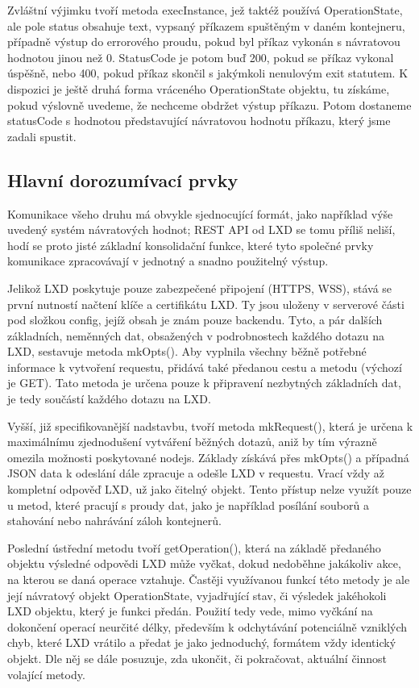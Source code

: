 \documentclass[a4paper,oneside,12pt]{report}
\begin{document}
Zvláštní výjimku tvoří metoda execInstance, jež taktéž používá OperationState, ale pole status obsahuje text, vypsaný příkazem spuštěným v daném kontejneru, případně výstup do errorového proudu, pokud byl příkaz vykonán s návratovou hodnotou jinou než 0. StatusCode je potom buď 200, pokud se příkaz vykonal úspěšně, nebo 400, pokud příkaz skončil s jakýmkoli nenulovým exit statutem. K dispozici je ještě druhá forma vráceného OperationState objektu, tu získáme, pokud výslovně uvedeme, že nechceme obdržet výstup příkazu. Potom dostaneme statusCode s hodnotou představující návratovou hodnotu příkazu, který jsme zadali spustit.

\subsection{Hlavní dorozumívací prvky}
Komunikace všeho druhu má obvykle sjednocující formát, jako například výše uvedený systém návratových hodnot; REST API od LXD se tomu příliš neliší, hodí se proto jisté základní konsolidační funkce, které tyto společné prvky komunikace zpracovávají v jednotný a snadno použitelný výstup.

Jelikož LXD poskytuje pouze zabezpečené připojení (HTTPS, WSS), stává se první nutností načtení klíče a certifikátu LXD. Ty jsou uloženy v serverové části pod složkou config, jejíž obsah je znám pouze backendu. Tyto, a pár dalších základních, neměnných dat, obsažených v podrobnostech každého dotazu na LXD, sestavuje metoda mkOpts(). Aby vyplnila všechny běžně potřebné informace k vytvoření requestu, přidává také předanou cestu a metodu (výchozí je GET). Tato metoda je určena pouze k připravení nezbytných základních dat, je tedy součástí každého dotazu na LXD.

Vyšší, již specifikovanější nadstavbu, tvoří metoda mkRequest(), která je určena k maximálnímu zjednodušení vytváření běžných dotazů, aniž by tím výrazně omezila možnosti poskytované nodejs. Základy získává přes mkOpts() a případná JSON data k odeslání dále zpracuje a odešle LXD v requestu. Vrací vždy až kompletní odpověď LXD, už jako čitelný objekt. Tento přístup nelze využít pouze u metod, které pracují s proudy dat, jako je například posílání souborů a stahování nebo nahrávání záloh kontejnerů.

Poslední ústřední metodu tvoří getOperation(), která na základě předaného objektu výsledné odpovědi LXD může vyčkat, dokud nedoběhne jakákoliv akce, na kterou se daná operace vztahuje. Častěji využívanou funkcí této metody je ale její návratový objekt OperationState, vyjadřující stav, či výsledek jakéhokoli LXD objektu, který je funkci předán. Použití tedy vede, mimo vyčkání na dokončení operací neurčité délky, především k odchytávání potenciálně vzniklých chyb, které LXD vrátilo a předat je jako jednoduchý, formátem vždy identický objekt. Dle něj se dále posuzuje, zda ukončit, či pokračovat, aktuální činnost volající metody.
\end{document}
